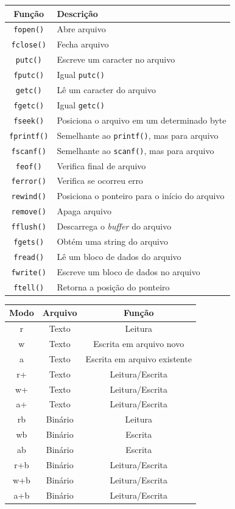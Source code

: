 \documentclass[12pt,a4paper]{article}
\begin{document}
\begin{longtable}[]{@{}cl@{}}
\toprule()
Função & Descrição \\
\midrule()
\endhead
\texttt{fopen()} & Abre arquivo \\
\texttt{fclose()} & Fecha arquivo \\
\texttt{putc()} & Escreve um caracter no arquivo \\
\texttt{fputc()} & Igual \texttt{putc()} \\
\texttt{getc()} & Lê um caracter do arquivo \\
\texttt{fgetc()} & Igual \texttt{getc()} \\
\texttt{fseek()} & Posiciona o arquivo em um determinado byte \\
\texttt{fprintf()} & Semelhante ao \texttt{printf()}, mas para
arquivo \\
\texttt{fscanf()} & Semelhante ao \texttt{scanf()}, mas para arquivo \\
\texttt{feof()} & Verifica final de arquivo \\
\texttt{ferror()} & Verifica se ocorreu erro \\
\texttt{rewind()} & Posiciona o ponteiro para o início do arquivo \\
\texttt{remove()} & Apaga arquivo \\
\texttt{fflush()} & Descarrega o \emph{buffer} do arquivo \\
\texttt{fgets()} & Obtém uma string do arquivo \\
\texttt{fread()} & Lê um bloco de dados do arquivo \\
\texttt{fwrite()} & Escreve um bloco de dados no arquivo \\
\texttt{ftell()} & Retorna a posição do ponteiro \\
\bottomrule()
\end{longtable}

    \begin{longtable}[]{@{}ccc@{}}
\toprule()
\textbf{Modo} & \textbf{Arquivo} & \textbf{Função} \\
\midrule()
\endhead
r & Texto & Leitura \\
w & Texto & Escrita em arquivo novo \\
a & Texto & Escrita em arquivo existente \\
r+ & Texto & Leitura/Escrita \\
w+ & Texto & Leitura/Escrita \\
a+ & Texto & Leitura/Escrita \\
rb & Binário & Leitura \\
wb & Binário & Escrita \\
ab & Binário & Escrita \\
r+b & Binário & Leitura/Escrita \\
w+b & Binário & Leitura/Escrita \\
a+b & Binário & Leitura/Escrita \\
\bottomrule()
\end{longtable}
\end{document}
